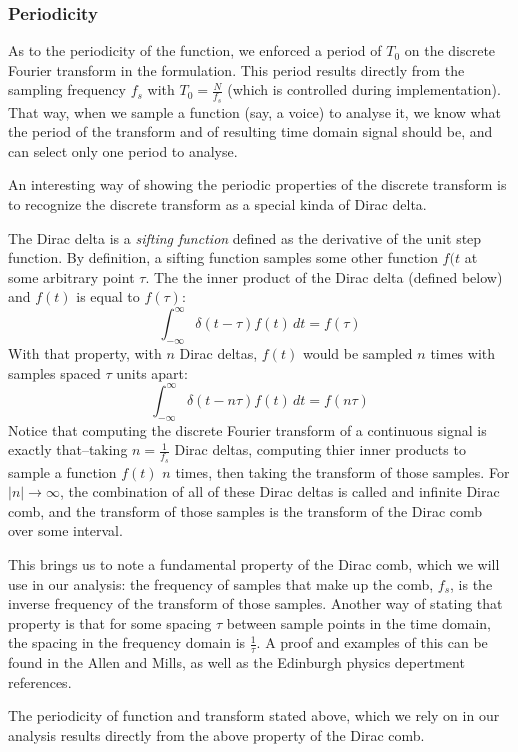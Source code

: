 \documentclass[12pt]{article}
\newcommand{\inftyint}{\int_{-\infty}^{\infty}}
\begin{document}
\subsubsection*{Periodicity}
As to the periodicity of the function, we enforced a period of \(T_0\) on the
discrete Fourier transform in the formulation. This period results directly
from the sampling frequency \(f_s\) with \(T_0 = \frac{N}{f_s}\) (which is
controlled during implementation). That way, when we sample a function (say, a
voice) to analyse it, we know what the period of the transform and of resulting
time domain signal should be, and can select only one period to analyse.

An interesting way of showing the periodic properties of the discrete transform
is to recognize the discrete transform as a special kinda of Dirac delta. 

The Dirac delta is a \emph{sifting function} defined as the derivative of the 
unit step function. By definition, a sifting function samples some other 
function \( f(t \) at some arbitrary point \( \tau \). The the inner product 
of the Dirac delta (defined below) and \( f(t)\) is equal to \( f(\tau) \):
\[ \inftyint \delta(t - \tau)f(t) \, dt = f(\tau) \]
With that property, with \(n\) Dirac deltas, \( f (t) \) would be sampled
\( n\) times with samples spaced \( \tau\) units apart:
\[ \inftyint \delta(t - n\tau)f(t) \, dt = f(n\tau) \]
Notice that computing the discrete Fourier transform of a continuous 
signal is exactly that--taking \( n = \frac{1}{f_s} \) Dirac deltas, computing 
thier inner products to sample a function \( f(t) \) \(n\) times, then
taking the transform of those samples. For \( |n| \to \infty \), the 
combination of all of these Dirac deltas is called and infinite Dirac comb, 
and the transform of those samples is the transform of the Dirac comb over some
interval. 

This brings us to note a fundamental property of the Dirac comb, which we will
use in our analysis: the frequency of samples that make up the comb, 
\( f_s \), is the inverse frequency of the transform of those samples.
Another way of stating that property is that for some spacing \( \tau\) 
between sample points in the time domain, the spacing in the frequency 
domain is \( \frac{1}{\tau} \). A proof and examples of this can be found in 
the Allen and Mills, as well as the Edinburgh physics depertment references.

The periodicity of function and transform stated above, which we rely on in 
our analysis results directly from the above property of the Dirac comb.
\end{document}
